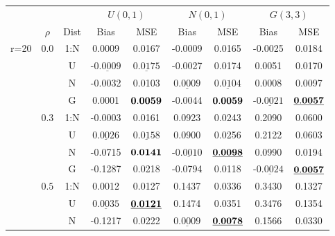 \documentclass[12pt]{article}
\newcommand{\ul}{\underline}
\begin{document}
\begin{table}[htp!]
\begin{center} \scriptsize{
	\begin{tabular}{|c|c|c|c|c|c|c|c|c| }
        \hline
       &  &&\multicolumn{2}{|c|}{$U(0,1)$}&\multicolumn{2}{|c|}{$N(0,1)$} & \multicolumn{2}{|c|}{$G(3,3)$}\\
    \cline{2-9}
&	$\rho$&Dist  & Bias & MSE & Bias & MSE & Bias   & MSE  \\
         \hline
\multirow{15}{1cm}{r=20}  &  $0.0$&1:N&    0.0009  & 0.0167     & -0.0009  & 0.0165   & -0.0025  & 0.0184    \\
   &       	 &U&-$\ul{0.0009}$  &$\ul{0.0175}$     & -0.0027  & 0.0174  & 0.0051  & 0.0170   \\
&	 &N&    -0.0032  & 0.0103     &$\ul{0.0009}$  &$\ul{0.0104}$   & 0.0008  & 0.0097   \\
&	 &G&    0.0001  &${\bf 0.0059}$     & -0.0044  &${\bf 0.0059}$ &-$\ul{0.0021}$  &${\bf\ul{0.0057}}$  \\
                 \cline{2-9}
  &       $0.3$&1:N&    -0.0003  & 0.0161   & 0.0923  & 0.0243  & 0.2090  & 0.0600  \\
&		   &U&$\ul{0.0026}$  &$\ul{0.0158}$     & 0.0900  & 0.0256 & 0.2122  & 0.0603  \\
&		   &N&    -0.0715  &${\bf 0.0141}$     &-$\ul{0.0010}$  &${\bf \ul{0.0098}}$  & 0.0990  & 0.0194\\
&		   &G&    -0.1287  & 0.0218     & -0.0794  & 0.0118  &-$\ul{0.0024}$  &${\bf\ul{0.0057}}$  \\
		         \cline{2-9}
&		 $0.5$&1:N&    0.0012  & 0.0127     & 0.1437  & 0.0336  & 0.3430  & 0.1327       \\
&		   &U&$\ul{0.0035}$  &${\bf\ul{0.0121}}$     & 0.1474  & 0.0351  & 0.3476  & 0.1354       \\
&		   &N&    -0.1217  & 0.0222     &$\ul{0.0009}$  &${\bf\ul{0.0078}}$  & 0.1566  & 0.0330       \\

\end{tabular}}
\end{center}
\end{table}
\end{document}
